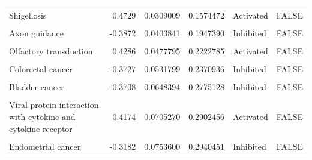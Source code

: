 \documentclass[9pt,a4paper,]{extarticle}
\begin{document}
\begin{table}
{\begin{tabular}[t]{lrrrll}
\addlinespace
\cellcolor{gray!6}{Longevity regulating pathway} & \cellcolor{gray!6}{0.4070} & \cellcolor{gray!6}{0.0283340} & \cellcolor{gray!6}{0.1478898} & \cellcolor{gray!6}{Activated} & \cellcolor{gray!6}{FALSE}\\
Shigellosis & 0.4729 & 0.0309009 & 0.1574472 & Activated & FALSE\\
\cellcolor{gray!6}{IL-17 signaling pathway} & \cellcolor{gray!6}{0.4055} & \cellcolor{gray!6}{0.0352484} & \cellcolor{gray!6}{0.1754221} & \cellcolor{gray!6}{Activated} & \cellcolor{gray!6}{FALSE}\\
Axon guidance & -0.3872 & 0.0403841 & 0.1947390 & Inhibited & FALSE\\
\cellcolor{gray!6}{EGFR tyrosine kinase inhibitor resistance} & \cellcolor{gray!6}{-0.3843} & \cellcolor{gray!6}{0.0409498} & \cellcolor{gray!6}{0.1947390} & \cellcolor{gray!6}{Inhibited} & \cellcolor{gray!6}{FALSE}\\
\addlinespace
Olfactory transduction & 0.4286 & 0.0477795 & 0.2222785 & Activated & FALSE\\
\cellcolor{gray!6}{FoxO signaling pathway} & \cellcolor{gray!6}{-0.4077} & \cellcolor{gray!6}{0.0508525} & \cellcolor{gray!6}{0.2315413} & \cellcolor{gray!6}{Inhibited} & \cellcolor{gray!6}{FALSE}\\
Colorectal cancer & -0.3727 & 0.0531799 & 0.2370936 & Inhibited & FALSE\\
\cellcolor{gray!6}{Fc epsilon RI signaling pathway} & \cellcolor{gray!6}{-0.3842} & \cellcolor{gray!6}{0.0558730} & \cellcolor{gray!6}{0.2440167} & \cellcolor{gray!6}{Inhibited} & \cellcolor{gray!6}{FALSE}\\
Bladder cancer & -0.3708 & 0.0648394 & 0.2775128 & Inhibited & FALSE\\
\addlinespace
\cellcolor{gray!6}{Spinocerebellar ataxia} & \cellcolor{gray!6}{0.3255} & \cellcolor{gray!6}{0.0674275} & \cellcolor{gray!6}{0.2829310} & \cellcolor{gray!6}{Activated} & \cellcolor{gray!6}{FALSE}\\
Viral protein interaction with cytokine and cytokine receptor & 0.4174 & 0.0705270 & 0.2902456 & Activated & FALSE\\
\cellcolor{gray!6}{Signaling pathways regulating pluripotency of stem cells} & \cellcolor{gray!6}{0.3469} & \cellcolor{gray!6}{0.0733669} & \cellcolor{gray!6}{0.2940451} & \cellcolor{gray!6}{Activated} & \cellcolor{gray!6}{FALSE}\\
Endometrial cancer & -0.3182 & 0.0753600 & 0.2940451 & Inhibited & FALSE\\

\end{tabular}}
\end{table}
\end{document}

